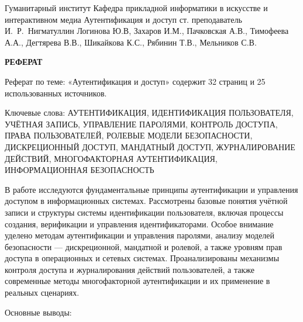\documentclass{SibFU-docs}
\begin{document}
\renewcommand{\contentsname}{}
\mycovertitle
{Гуманитарный институт}
{Кафедра прикладной информатики в искусстве и интерактивном медиа}
{Аутентификация и доступ}
{ст. преподаватель И.~Р.~Нигматуллин}
{Логинова Ю.В, Захаров И.М., Пачковская А.В., Тимофеева А.А., Дегтярева В.В., Шикайкова К.С., Рябинин Т.В., Мельников С.В.}
 
\begin{center}
\bfseries РЕФЕРАТ
\end{center}
\noindent

Реферат по теме: «Аутентификация и доступ» содержит 32 страниц и 25 использованных источников.

Ключевые слова: АУТЕНТИФИКАЦИЯ, ИДЕНТИФИКАЦИЯ ПОЛЬЗОВАТЕЛЯ, УЧЁТНАЯ ЗАПИСЬ, УПРАВЛЕНИЕ ПАРОЛЯМИ, КОНТРОЛЬ ДОСТУПА, ПРАВА ПОЛЬЗОВАТЕЛЕЙ, РОЛЕВЫЕ МОДЕЛИ БЕЗОПАСНОСТИ, ДИСКРЕЦИОННЫЙ ДОСТУП, МАНДАТНЫЙ ДОСТУП, ЖУРНАЛИРОВАНИЕ ДЕЙСТВИЙ, МНОГОФАКТОРНАЯ АУТЕНТИФИКАЦИЯ, ИНФОРМАЦИОННАЯ БЕЗОПАСНОСТЬ

В работе исследуются фундаментальные принципы аутентификации и управления доступом в информационных системах. Рассмотрены базовые понятия учётной записи и структуры системы идентификации пользователя, включая процессы создания, верификации и управления идентификаторами. Особое внимание уделено методам аутентификации и управления паролями, анализу моделей безопасности — дискреционной, мандатной и ролевой, а также уровням прав доступа в операционных и сетевых системах. Проанализированы механизмы контроля доступа и журналирования действий пользователей, а также современные методы многофакторной аутентификации и их применение в реальных сценариях.

Основные выводы:
\end{document}
